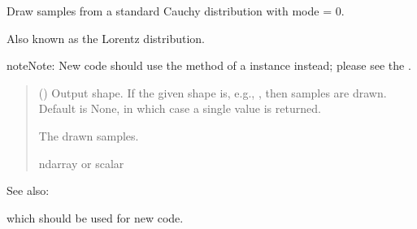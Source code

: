 \documentclass[letterpaper,10pt,english]{sphinxmanual}
\begin{document}

\begin{fulllineitems}
\label{\detokenize{metilda.controllers:metilda.controllers.pitch_art_wizard.standard_cauchy}}
\pysigstartsignatures
{}
\pysigstopsignatures
\sphinxAtStartPar
Draw samples from a standard Cauchy distribution with mode = 0.

\sphinxAtStartPar
Also known as the Lorentz distribution.

\begin{sphinxadmonition}{note}{Note:}
\sphinxAtStartPar
New code should use the
method of a  instance instead;
please see the .
\end{sphinxadmonition}
\begin{quote}\begin{description}
\sphinxAtStartPar
{} (\sphinxstyleliteralemphasis{\sphinxupquote{, }}) \textendash{} Output shape.  If the given shape is, e.g., , then
 samples are drawn.  Default is None, in which case a
single value is returned.

\sphinxAtStartPar
{} \textendash{} The drawn samples.

\sphinxAtStartPar
ndarray or scalar

\end{description}\end{quote}


\begin{sphinxseealso}{See also:}
\begin{description}
\sphinxAtStartPar
which should be used for new code.


\end{description}
\end{sphinxseealso}
\end{fulllineitems}
\end{document}

